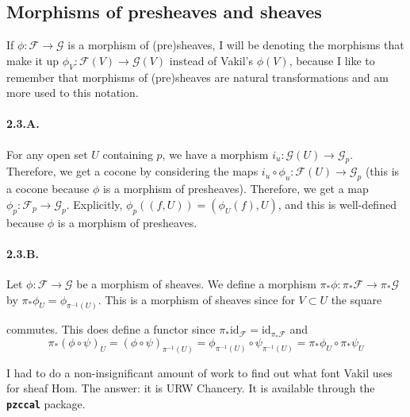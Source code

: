 \documentclass{article}
\newcommand{\id}{\mathrm{id}}
\DeclareMathOperator{\res}{res}
\newcommand{\Fsheaf}{\mathscr{F}}
\newcommand{\Gsheaf}{\mathscr{G}}
\begin{document}
\subsection{Morphisms of presheaves and sheaves}

If $\phi : \Fsheaf \to \Gsheaf$ is a morphism of (pre)sheaves, I will be denoting the morphisms that make it up $\phi_V : \Fsheaf(V) \to \Gsheaf(V)$ instead of Vakil's $\phi(V)$, because I like to remember that morphisms of (pre)sheaves are natural transformations and am more used to this notation.

\paragraph{2.3.A.} For any open set $U$ containing $p$, we have a morphism $i_u : \Gsheaf(U) \to \Gsheaf_p$. Therefore, we get a cocone by considering the maps $i_u \circ \phi_u : \Fsheaf(U) \to \Gsheaf_p$ (this is a cocone because $\phi$ is a morphism of presheaves). Therefore, we get a map $\phi_p : \Fsheaf_p \to \Gsheaf_p$. Explicitly, $\phi_p ((f,U)) = (\phi_U(f),U)$, and this is well-defined because $\phi$ is a morphism of presheaves.

\paragraph{2.3.B.} Let $\phi : \Fsheaf \to \Gsheaf$ be a morphism of sheaves. We define a morphism $\pi_* \phi : \pi_* \Fsheaf \to \pi_* \Gsheaf$ by $\pi_*\phi_U = \phi_{\pi^{-1}(U)}$. This is a morphism of sheaves since for $V \subset U$ the square
\begin{center}
\end{center}
commutes. This does define a functor since $\pi_* \id_\Fsheaf = \id_{\pi_* \Fsheaf}$ and 
\[\pi_* (\phi \circ \psi)_U = (\phi \circ \psi)_{\pi^{-1}(U)} = \phi_{\pi^{-1}(U)} \circ \psi_{\pi^{-1}(U)} = \pi_* \phi_U \circ \pi_*\psi_U\]

I had to do a non-insignificant amount of work to find out what font Vakil uses for sheaf Hom. The answer: it is URW Chancery. It is available through the \texttt{\bfseries pzccal} package.
\end{document}
